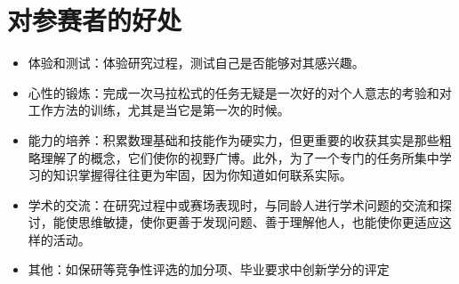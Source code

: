\documentclass[a4paper,10pt,english]{sphinxmanual}
\begin{document}
\section{对参赛者的好处}
\label{\detokenize{Introduction:id9}}\begin{itemize}
\item {} 
体验和测试：体验研究过程，测试自己是否能够对其感兴趣。

\item {} 
心性的锻炼：完成一次马拉松式的任务无疑是一次好的对个人意志的考验和对工作方法的训练，尤其是当它是第一次的时候。

\item {} 
能力的培养：积累数理基础和技能作为硬实力，但更重要的收获其实是那些粗略理解了的概念，它们使你的视野广博。此外，为了一个专门的任务所集中学习的知识掌握得往往更为牢固，因为你知道如何联系实际。

\item {} 
学术的交流：在研究过程中或赛场表现时，与同龄人进行学术问题的交流和探讨，能使思维敏捷，使你更善于发现问题、善于理解他人，也能使你更适应这样的活动。

\item {} 
其他：如保研等竞争性评选的加分项、毕业要求中创新学分的评定

\end{itemize}



\renewcommand{\indexname}{索引}
\printindex
\end{document}
